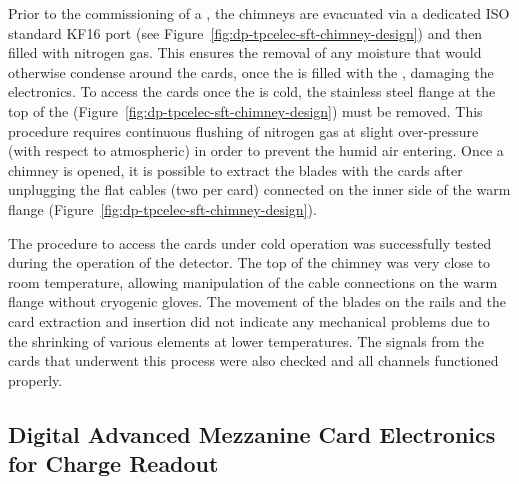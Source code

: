 Prior to the commissioning of a , the chimneys are evacuated via a dedicated ISO standard KF16 port (see Figure~\ref{fig:dp-tpcelec-sft-chimney-design}) and then filled with nitrogen gas. This ensures the removal of any moisture that would otherwise condense around the  cards, once the  is filled with the \lar, damaging the electronics. To access the  cards once the  is cold, the stainless steel flange at the top of the  (Figure~\ref{fig:dp-tpcelec-sft-chimney-design}) must be removed. This procedure requires continuous flushing of nitrogen gas at slight over-pressure (with respect to atmospheric) in order to prevent the humid air entering. Once a chimney is opened, it is possible to extract the blades with the  cards after unplugging the flat cables (two per card) connected on the inner side of the warm flange (Figure~\ref{fig:dp-tpcelec-sft-chimney-design}).

The procedure to access the  cards under cold operation was successfully tested during the operation of the  detector. The top of the chimney was very close to room temperature, allowing manipulation of the cable connections on the warm \fdth flange without cryogenic gloves. The movement of the blades on the rails and the  card extraction and insertion did not indicate any mechanical problems due to the shrinking of various elements at lower temperatures.  The signals from the  cards that underwent this process were also checked and all channels functioned properly.


\subsection{Digital Advanced Mezzanine Card Electronics for Charge Readout}
\label{ssec:dp-tpcelec-design-amc}

